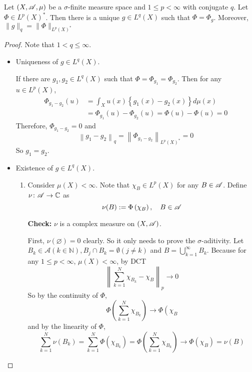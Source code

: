 \begin{thm}
	Let $(X,\mathscr{A},\mu)$ be a $\sigma$-finite measure space and $1 \leq p < \infty$ with conjugate $q$. Let $\Phi \in L^p(X)^*$. Then there is a unique $g \in L^q(X)$ such that $\Phi = \Phi_g$. Moreover, $\|g\|_{q}=\|\Phi\|_{L^p(X)^*}$
\end{thm}
\begin{proof}
	Note that $1 < q \leq \infty$.
	\begin{itemize}
		\item Uniqueness of $g \in L^q(X)$.

		\noindent If there are $g_1,g_2 \in L^q(X)$ such that $\Phi = \Phi_{g_1} = \Phi_{g_2}$. Then for any $u \in L^p(X)$,
		\begin{equation*}
			\begin{aligned}
				\Phi_{g_1-g_2}(u) & =\int_X u(x)\left\{g_1(x)-g_2(x)\right\} d \mu(x) \\
				& =\Phi_{g_1}(u)-\Phi_{g_2}(u)=\Phi(u)-\Phi(u)=0
			\end{aligned}
		\end{equation*}
		Therefore, $\Phi_{g_1-g_2} = 0$ and
		\begin{equation*}
			\left\|g_1-g_2\right\|_{q}=\left\|\Phi_{g_1-g_2}\right\|_{L^p(X)^*}=0
		\end{equation*}
		So $g_1 = g_2$.

		\item Existence of $g \in L^q(X)$.
		\begin{enumerate}[label=(\roman*)]
			\item Consider $\mu(X) < \infty$. Note that $\chi_B \in L^p(X)$ for any $B \in \mathscr{A}$. Define $\nu \colon \mathscr{A} \rightarrow \mathbb{C}$ as
			\begin{equation*}
				\nu(B):=\Phi\left(\chi_B\right),\quad B \in \mathscr{A}
			\end{equation*}

			\noindent \textbf{Check:} $\nu$ is a complex measure on $(X,\mathscr{A})$.

			\noindent First, $\nu(\varnothing) = 0$ clearly. So it only needs to prove the $\sigma$-aditivity. Let $B_k \in \mathscr{A}(k \in \mathbb{N}), B_j \cap B_k=\emptyset(j \neq k)$ and $B=\bigcup_{k=1}^{\infty} B_k$. Because for any $1 \leq p < \infty$, $\mu(X) < \infty$, by DCT
			\begin{equation*}
				\left\|\sum_{k=1}^N \chi_{B_k}-\chi_B\right\|_{p} \longrightarrow 0
			\end{equation*}
			So by the continuity of $\Phi$,
			\begin{equation*}
				\Phi\left(\sum_{k=1}^N \chi_{B_k}\right) \longrightarrow \Phi\left(\chi_B\right.
			\end{equation*}
			and by the linearity of $\Phi$,
			\begin{equation*}
				\sum_{k=1}^N \nu\left(B_k\right)=\sum_{k=1}^N \Phi\left(\chi_{B_k}\right)=\Phi\left(\sum_{k=1}^N \chi_{B_k}\right) \longrightarrow \Phi\left(\chi_B\right)=\nu(B)
			\end{equation*}


\end{enumerate}
\end{itemize}
\end{proof}
